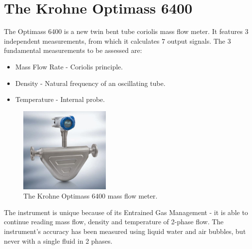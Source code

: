\documentclass{report}
\begin{document}
\section{The Krohne Optimass 6400}
The Optimass 6400 is a new twin bent tube coriolis mass flow meter. It features 3 independent measurements, from which it calculates 7 output signals. The 3 fundamental measurements to be assessed are:
\begin{itemize}
\item{Mass Flow Rate - Coriolis principle.}
\item{Density - Natural frequency of an oscillating tube.}
\item{Temperature - Internal probe.}
\end{itemize}
\begin{figure}
\includegraphics[width=0.4\textwidth]{Optimass6400}
\caption{The Krohne Optimass 6400 mass flow meter.} %
\label{fig:optimass6400}
\end{figure}
The instrument is unique because of its Entrained Gas Management - it is able to continue reading mass flow, density and temperature of 2-phase flow. The instrument's accuracy has been measured using liquid water and air bubbles, but never with a single fluid in 2 phases. 
\end{document}
